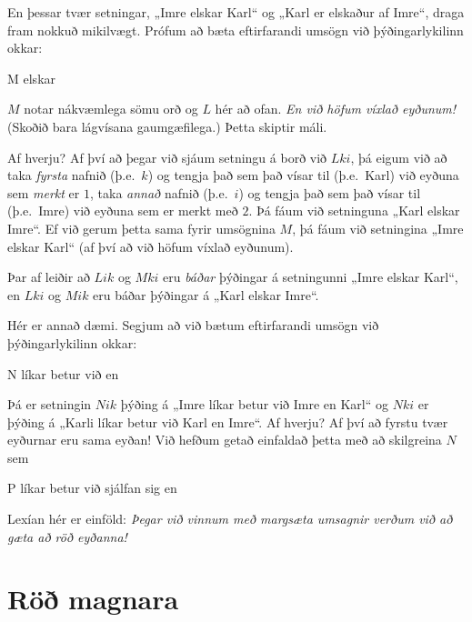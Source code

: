 En þessar tvær setningar, „Imre elskar Karl“ og „Karl er elskaður af Imre“, draga fram nokkuð mikilvægt. Prófum að bæta eftirfarandi umsögn við þýðingarlykilinn okkar:
	\begin{ekey}
		\item[M]  elskar 
	\end{ekey}
$M$ notar nákvæmlega sömu orð og $L$ hér að ofan. \emph{En við höfum víxlað eyðunum!} (Skoðið bara lágvísana gaumgæfilega.) Þetta skiptir máli.	

Af hverju? Af því að þegar við sjáum setningu á borð við $Lki$, þá eigum við að taka \emph{fyrsta} nafnið (þ.e.\ $k$) og tengja það sem það vísar til (þ.e.\ Karl) við eyðuna sem \emph{merkt} er $1$, taka \emph{annað} nafnið (þ.e.\ $i$) og tengja það sem það vísar til (þ.e.\ Imre) við eyðuna sem er merkt með $2$. Þá fáum við setninguna „Karl elskar Imre“. Ef við gerum þetta sama fyrir umsögnina $M$, þá fáum við setningina „Imre elskar Karl“ (af því að við höfum víxlað eyðunum).

Þar af leiðir að $Lik$ og $Mki$ eru \emph{báðar} þýðingar á setningunni „Imre elskar Karl“, en $Lki$ og $Mik$ eru báðar þýðingar á „Karl elskar Imre“. 

Hér er annað dæmi. Segjum að við bætum eftirfarandi umsögn við þýðingarlykilinn okkar:

\begin{ekey}
	\item[N]  líkar betur við  en \gap{2}
\end{ekey}
Þá er setningin $Nik$ þýðing á „Imre líkar betur við Imre en Karl“ og $Nki$ er þýðing á „Karli líkar betur við Karl en Imre“. Af hverju? Af því að fyrstu tvær eyðurnar eru sama eyðan! Við hefðum getað einfaldað þetta með að skilgreina $N$ sem 
\begin{ekey}
	\item[P]  líkar betur við sjálfan sig en 
\end{ekey}
Lexían hér er einföld: \emph{Þegar við vinnum með margsæta umsagnir verðum við að gæta að röð eyðanna!}

\section{Röð magnara}

